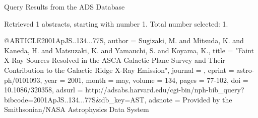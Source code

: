 Query Results from the ADS Database


Retrieved 1 abstracts, starting with number 1.  Total number selected: 1.

@ARTICLE{2001ApJS..134...77S,
   author = {{Sugizaki}, M. and {Mitsuda}, K. and {Kaneda}, H. and {Matsuzaki}, K. and 
	{Yamauchi}, S. and {Koyama}, K.},
    title = "{Faint X-Ray Sources Resolved in the ASCA Galactic Plane Survey and Their Contribution to the Galactic Ridge X-Ray Emission}",
  journal = {\apjs},
   eprint = {astro-ph/0101093},
     year = 2001,
    month = may,
   volume = 134,
    pages = {77-102},
      doi = {10.1086/320358},
   adsurl = {http://adsabs.harvard.edu/cgi-bin/nph-bib_query?bibcode=2001ApJS..134...77S&db_key=AST},
  adsnote = {Provided by the Smithsonian/NASA Astrophysics Data System}
}


